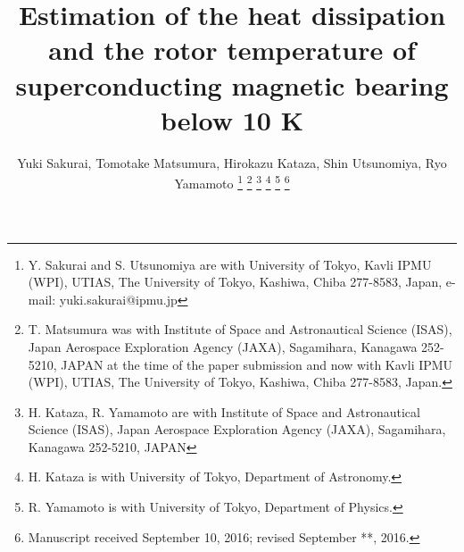 \documentclass[journal]{IEEEtran}
\begin{document}
%
\title{Estimation of the heat dissipation and the rotor temperature of superconducting magnetic bearing below 10 K}
%
%
%

\author{Yuki Sakurai, Tomotake Matsumura, Hirokazu Kataza, Shin Utsunomiya, Ryo Yamamoto
\thanks{Y. Sakurai and S. Utsunomiya are with University of Tokyo, Kavli IPMU (WPI), UTIAS, The University of Tokyo, Kashiwa, Chiba 277-8583, Japan, e-mail: yuki.sakurai@ipmu.jp}
\thanks{T. Matsumura was with Institute of Space and Astronautical Science (ISAS), Japan Aerospace Exploration Agency (JAXA), Sagamihara, Kanagawa 252-5210, JAPAN at the time of the paper submission and now with Kavli IPMU (WPI), UTIAS, The University of Tokyo, Kashiwa, Chiba 277-8583, Japan.}
\thanks{H. Kataza, R. Yamamoto are with Institute of Space and Astronautical Science (ISAS), Japan Aerospace Exploration Agency (JAXA), Sagamihara, Kanagawa 252-5210, JAPAN}
\thanks{H. Kataza is with University of Tokyo, Department of Astronomy.}
\thanks{R. Yamamoto is with University of Tokyo, Department of Physics.}
\thanks{Manuscript received September 10, 2016; revised September **, 2016.}}

%
%
\end{document}
